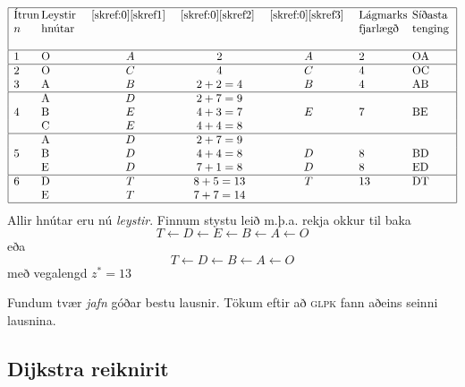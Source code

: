 \begin{lausn}

{\renewcommand{\arraystretch}{1.5} \renewcommand{\tabcolsep}{0.2cm}
{\footnotesize\[
\begin{array}{|p{.5cm}p{1.2cm}cccp{1.3cm}p{1.2cm}|}
\hline
 \textrm{Ítrun } $n$ &
 \textrm{Leystir hnútar }&
 \textrm{\ref{skref:0}\ref{skref1} }&
 \textrm{\ref{skref:0}\ref{skref2} }&
\textrm{\ref{skref:0}\ref{skref3} }& 
 \textrm{Lágmarks fjarlægð} &
 \textrm{Síðasta tenging} \\ 
\hline
1 & O & A & 2 & A & 2 & OA \\ 
\hline
2 & O & C & 4 & C & 4 & OC \\ 
3 & A & B & 2+2=4 & B & 4 & AB \\ 
\hline
 & A & D & 2+7=9 &  &  &  \\ 
4 & B & E & 4+3=7 & E & 7 & BE \\ 
 & C & E & 4+4=8 &  &  &  \\ 
\hline
 & A & D & 2+7=9 &  &  &  \\ 
5 & B & D & 4+4=8 & D & 8 & BD \\ 
 & E & D & 7+1=8 & D & 8 & ED \\ 
\hline
6 & D & T & 8+5=13 & T & 13 & DT \\ 
 & E & T & 7+7=14 &  &  &  \\ 
\hline
\end{array}\]
}}
Allir hnútar eru nú \emph{leystir}. Finnum stystu leið m.þ.a. rekja okkur til baka
$$ T\leftarrow D\leftarrow E \leftarrow B \leftarrow A \leftarrow O$$
eða 
$$ T\leftarrow D\leftarrow B \leftarrow A \leftarrow O$$
með vegalengd $z^*=13$ 
\begin{aths}Fundum tvær \emph{jafn} góðar bestu lausnir. Tökum eftir að \textsc{glpk} fann aðeins seinni lausnina.
\end{aths}


\end{lausn}
\newpage
\subsection{Dijkstra reiknirit}


